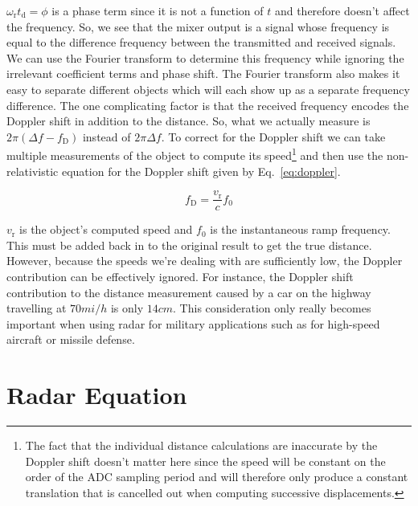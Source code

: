 $\omega_{\text{r}}t_{\text{d}} = \phi$ is a phase term since it is not a function of $t$ and
therefore doesn't affect the frequency. So, we see that the mixer output is a signal whose frequency
is equal to the difference frequency between the transmitted and received signals. We can use the
Fourier transform to determine this frequency while ignoring the irrelevant coefficient terms and
phase shift. The Fourier transform also makes it easy to separate different objects which will each
show up as a separate frequency difference. The one complicating factor is that the received
frequency encodes the Doppler shift in addition to the distance. So, what we actually measure is
$2 \pi (\Delta f - f_{\text{D}})$ instead of $2 \pi \Delta f$. To correct for the Doppler shift we
can take multiple measurements of the object to compute its speed\footnote{The fact that the
  individual distance calculations are inaccurate by the Doppler shift doesn't matter here since the
  speed will be constant on the order of the ADC sampling period and will therefore only produce a
  constant translation that is cancelled out when computing successive displacements.} and then use
the non-relativistic equation for the Doppler shift given by Eq.~\ref{eq:doppler}.

\begin{equation}
        \label{eq:doppler}
        f_{\text{D}} = \frac{v_{\text{r}}}{c} f_0
\end{equation}

$v_{\text{r}}$ is the object's computed speed and $f_0$ is the instantaneous ramp frequency. This
must be added back in to the original result to get the true distance. However, because the speeds
we're dealing with are sufficiently low, the Doppler contribution can be effectively ignored. For
instance, the Doppler shift contribution to the distance measurement caused by a car on the highway
travelling at $70 \si{mi/h}$ is only $14 \si{cm}$. This consideration only really becomes important
when using radar for military applications such as for high-speed aircraft or missile defense.

\section{Radar Equation}
\label{sec:radar-equation}


